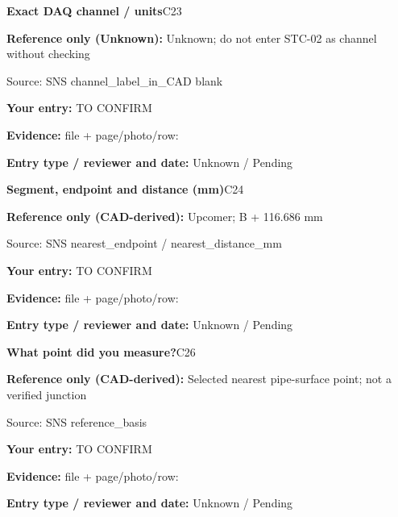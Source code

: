 \documentclass[11pt]{article}
\begin{document}
\begin{minipage}{\textwidth}\small
{\color{navy}\bfseries Exact DAQ channel / units}\hfill C23\par
\colorbox{pale}{\parbox{\dimexpr\linewidth-2\fboxsep\relax}{
\textbf{Reference only (Unknown):} Unknown; do not enter STC-02 as channel without checking\par
{\footnotesize Source: SNS channel\_\allowbreak{}label\_\allowbreak{}in\_\allowbreak{}CAD blank}}}\par
\textbf{Your entry:} {\color{muted}TO CONFIRM}\enspace\hrulefill\par
{\footnotesize\textbf{Evidence:} file + page/photo/row: \hrulefill\par
\textbf{Entry type / reviewer and date:} Unknown / Pending\par
}\end{minipage}\par\vspace{5pt}
\begin{minipage}{\textwidth}\small
{\color{navy}\bfseries Segment, endpoint and distance (mm)}\hfill C24\par
\colorbox{pale}{\parbox{\dimexpr\linewidth-2\fboxsep\relax}{
\textbf{Reference only (CAD-derived):} Upcomer; B + 116.686 mm\par
{\footnotesize Source: SNS nearest\_\allowbreak{}endpoint / nearest\_\allowbreak{}distance\_\allowbreak{}mm}}}\par
\textbf{Your entry:} {\color{muted}TO CONFIRM}\enspace\hrulefill\par
{\footnotesize\textbf{Evidence:} file + page/photo/row: \hrulefill\par
\textbf{Entry type / reviewer and date:} Unknown / Pending\par
}\end{minipage}\par\vspace{5pt}
\begin{minipage}{\textwidth}\small
{\color{navy}\bfseries What point did you measure?}\hfill C26\par
\colorbox{pale}{\parbox{\dimexpr\linewidth-2\fboxsep\relax}{
\textbf{Reference only (CAD-derived):} Selected nearest pipe-surface point; not a verified junction\par
{\footnotesize Source: SNS reference\_\allowbreak{}basis}}}\par
\textbf{Your entry:} {\color{muted}TO CONFIRM}\enspace\hrulefill\par
{\footnotesize\textbf{Evidence:} file + page/photo/row: \hrulefill\par
\textbf{Entry type / reviewer and date:} Unknown / Pending\par
}\end{minipage}\par\vspace{5pt}
\end{document}
